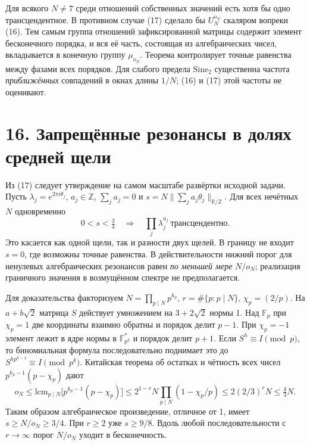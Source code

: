 \documentclass[11pt,a4paper]{article}
\newcommand{\R}{\mathbb R}
\newcommand{\Z}{\mathbb Z}
\newcommand{\sect}[1]{\section*{\sffamily\color{ink}#1}}
\begin{document}
Для всякого $N\ne7$ среди отношений собственных значений есть хотя бы одно трансцендентное. В противном случае (17) сделало бы $U_N^{o_N}$ скаляром вопреки (16). Тем самым группа отношений зафиксированной матрицы содержит элемент бесконечного порядка, и вся её часть, состоящая из алгебраических чисел, вкладывается в конечную группу $\mu_{o_N}$. Теорема контролирует точные равенства между фазами всех порядков. Для слабого предела $\mathrm{Sine}_2$ существенна частота \emph{приближённых} совпадений в окнах длины $1/N$; (16) и (17) этой частоты не оценивают.

\newpage
\sect{16. Запрещённые резонансы в долях средней щели}
Из (17) следует утверждение на самом масштабе развёртки исходной задачи. Пусть $\lambda_j=e^{2\pi i\theta_j}$, $a_j\in\Z$, $\sum_j a_j=0$ и $s=N\|\sum_j a_j\theta_j\|_{\R/\Z}$. Для всех нечётных $N$ одновременно
\[
 0<s<\tfrac34\quad\Longrightarrow\quad
                   \prod_j\lambda_j^{a_j}\ \text{трансцендентно}.         \tag{18}
\]
Это касается как одной щели, так и разности двух щелей. В границу не входит $s=0$, где возможны точные равенства. В действительности нижний порог для ненулевых алгебраических резонансов равен \emph{по меньшей мере} $N/o_N$; реализация граничного значения в возмущённом спектре не предполагается.

Для доказательства факторизуем $N=\prod_{p\mid N}p^{k_p}$, $r=\#\{p:p\mid N\}$, $\chi_p=(2/p)$. На $a+b\sqrt2$ матрица $S$ действует умножением на $3+2\sqrt2$ нормы 1. Над $\mathbb F_p$ при $\chi_p=1$ две координаты взаимно обратны и порядок делит $p-1$. При $\chi_p=-1$ элемент лежит в ядре нормы в $\mathbb F_{p^2}^*$ и порядок делит $p+1$. Если $S^h\equiv I\pmod p$, то биномиальная формула последовательно поднимает это до $S^{hp^{k-1}}\equiv I\pmod {p^k}$. Китайская теорема об остатках и чётность всех чисел $p^{k_p-1}(p-\chi_p)$ дают
\[
 o_N\le\mathrm{lcm}_{p\mid N}\big[p^{k_p-1}(p-\chi_p)\big]
 \le 2^{1-r}N\prod_{p\mid N}(1-\chi_p/p)
 \le 2(2/3)^r N\le\tfrac43 N .
\]
Таким образом алгебраическое произведение, отличное от 1, имеет $s\ge N/o_N\ge3/4$. При $r\ge2$ уже $s\ge9/8$. Вдоль любой последовательности с $r\to\infty$ порог $N/o_N$ уходит в бесконечность.
\end{document}

